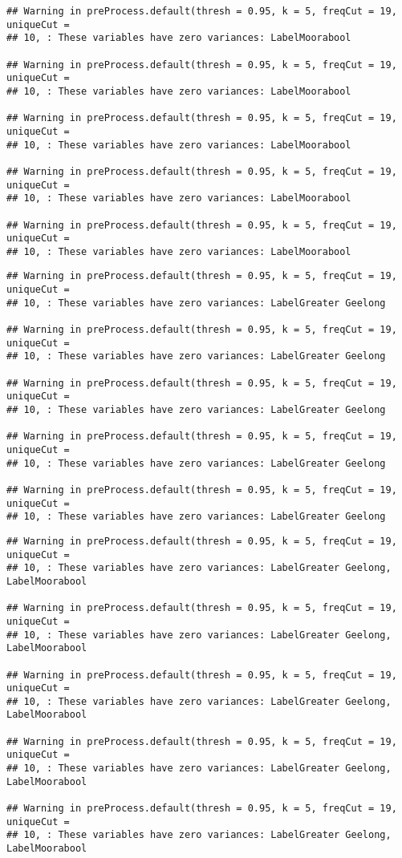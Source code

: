 \documentclass[
]{article}
\begin{document}
\begin{verbatim}
## Warning in preProcess.default(thresh = 0.95, k = 5, freqCut = 19, uniqueCut =
## 10, : These variables have zero variances: LabelMoorabool

## Warning in preProcess.default(thresh = 0.95, k = 5, freqCut = 19, uniqueCut =
## 10, : These variables have zero variances: LabelMoorabool

## Warning in preProcess.default(thresh = 0.95, k = 5, freqCut = 19, uniqueCut =
## 10, : These variables have zero variances: LabelMoorabool

## Warning in preProcess.default(thresh = 0.95, k = 5, freqCut = 19, uniqueCut =
## 10, : These variables have zero variances: LabelMoorabool

## Warning in preProcess.default(thresh = 0.95, k = 5, freqCut = 19, uniqueCut =
## 10, : These variables have zero variances: LabelMoorabool
\end{verbatim}

\begin{verbatim}
## Warning in preProcess.default(thresh = 0.95, k = 5, freqCut = 19, uniqueCut =
## 10, : These variables have zero variances: LabelGreater Geelong

## Warning in preProcess.default(thresh = 0.95, k = 5, freqCut = 19, uniqueCut =
## 10, : These variables have zero variances: LabelGreater Geelong

## Warning in preProcess.default(thresh = 0.95, k = 5, freqCut = 19, uniqueCut =
## 10, : These variables have zero variances: LabelGreater Geelong

## Warning in preProcess.default(thresh = 0.95, k = 5, freqCut = 19, uniqueCut =
## 10, : These variables have zero variances: LabelGreater Geelong

## Warning in preProcess.default(thresh = 0.95, k = 5, freqCut = 19, uniqueCut =
## 10, : These variables have zero variances: LabelGreater Geelong
\end{verbatim}

\begin{verbatim}
## Warning in preProcess.default(thresh = 0.95, k = 5, freqCut = 19, uniqueCut =
## 10, : These variables have zero variances: LabelGreater Geelong, LabelMoorabool

## Warning in preProcess.default(thresh = 0.95, k = 5, freqCut = 19, uniqueCut =
## 10, : These variables have zero variances: LabelGreater Geelong, LabelMoorabool

## Warning in preProcess.default(thresh = 0.95, k = 5, freqCut = 19, uniqueCut =
## 10, : These variables have zero variances: LabelGreater Geelong, LabelMoorabool

## Warning in preProcess.default(thresh = 0.95, k = 5, freqCut = 19, uniqueCut =
## 10, : These variables have zero variances: LabelGreater Geelong, LabelMoorabool

## Warning in preProcess.default(thresh = 0.95, k = 5, freqCut = 19, uniqueCut =
## 10, : These variables have zero variances: LabelGreater Geelong, LabelMoorabool
\end{verbatim}
\end{document}
